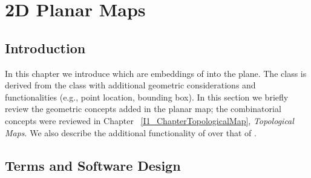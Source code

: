 
\def\Ipe#1{\def\IPEfile{#1}}

\renewcommand{\Re}{{\rm I\!\hspace{-0.025em} R}}

\def\C{{\cal C}}
\def\G{{\cal G}}
\def\F{{\cal F}}
\def\I{{\cal I}}
\def\U{{\cal U}}
\def\M{{\cal M}}
\def\eps{{\varepsilon}}
\def\bd{{\partial}}
\def\dm{{\cal D}}

\chapter{2D Planar Maps}
\label{I1_ChapterPlanarMap}

\section{Introduction}
\label{PM_sec:intro}

In this chapter we introduce  which are 
embeddings of  into the plane.
The  class is derived
from the  class with additional geometric considerations
and functionalities (e.g., point location, bounding box). 
In this section we briefly review
the geometric concepts added in the planar map; the combinatorial concepts were
reviewed in Chapter ~\ref{I1_ChapterTopologicalMap}, {\em Topological Maps}.
We also describe the additional functionality of 
over that of .

\section{Terms and Software Design}

